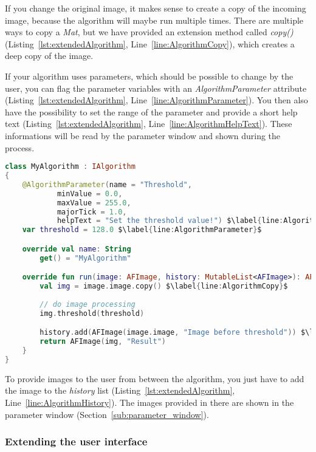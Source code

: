 If you change the original image, it makes sense to create a copy of the incoming image, because the algorithm will maybe run multiple times. There are multiple ways to copy a \textit{Mat}, but we have provided an extension method called \textit{copy()} (Listing~\ref{lst:extendedAlgorithm}, Line~\ref{line:AlgorithmCopy}), which creates a deep copy of the image.

If your algorithm uses parameters, which should be possible to change by the user, you can flag the parameter variables with an \textit{AlgorithmParameter} attribute (Listing~\ref{lst:extendedAlgorithm}, Line~\ref{line:AlgorithmParameter}). You then also have the possibility to set the range of the parameter and provide a short help text (Listing~\ref{lst:extendedAlgorithm}, Line~\ref{line:AlgorithmHelpText}). These informations will be read by the parameter window and shown during the process.

\begin{lstlisting}[caption={Extended version of an algorithm.}, label={lst:extendedAlgorithm}, language=Kotlin, escapechar=$]
class MyAlgorithm : IAlgorithm
{
    @AlgorithmParameter(name = "Threshold",
            minValue = 0.0,
            maxValue = 255.0,
            majorTick = 1.0,
            helpText = "Set the threshold value!") $\label{line:AlgorithmHelpText}$
    var threshold = 128.0 $\label{line:AlgorithmParameter}$

    override val name: String
        get() = "MyAlgorithm"

    override fun run(image: AFImage, history: MutableList<AFImage>): AFImage {
        val img = image.image.copy() $\label{line:AlgorithmCopy}$
        
        // do image processing
        img.threshold(threshold)

        history.add(AFImage(image.image, "Image before threshold")) $\label{line:AlgorithmHistory}$
        return AFImage(img, "Result")
    }
}
\end{lstlisting}

To provide images to the user from between the algorithm, you just have to add the image to the \textit{history} list (Listing~\ref{lst:extendedAlgorithm}, Line~\ref{line:AlgorithmHistory}). The images provided in there are shown in the parameter window (Section~\ref{sub:parameter_window}).

\subsubsection{Extending the user interface}

